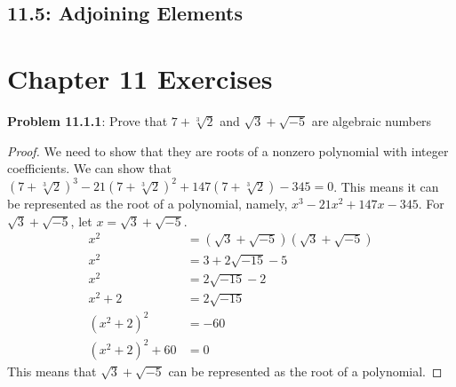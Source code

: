 \documentclass[12pt]{article}
\begin{document}
\subsection*{11.5: Adjoining Elements}
\begin{itemize}
\end{itemize}

\newpage
\section*{Chapter 11 Exercises}
\textbf{Problem 11.1.1}: Prove that $7 + \sqrt[3]{2}$ and $\sqrt{3} + \sqrt{-5}$ are algebraic numbers
\begin{proof}
We need to show that they are roots of a nonzero polynomial with integer coefficients. We can show that $(7 + \sqrt[3]{2})^3 - 21(7 + \sqrt[3]{2})^2 + 147(7 + \sqrt[3]{2}) - 345 = 0$. This means it can be represented as the root of a polynomial, namely, $x^3 - 21x^2 + 147x - 345$. For $\sqrt{3} + \sqrt{-5}$, let $x = \sqrt{3} + \sqrt{-5}$.
\begin{align*}
  x^2 &= (\sqrt{3} + \sqrt{-5})(\sqrt{3} + \sqrt{-5}) \\
  x^2 &= 3 + 2\sqrt{-15} - 5 \\
  x^2 &= 2\sqrt{-15} - 2 \\
  x^2 + 2 &= 2\sqrt{-15} \\
  (x^2 + 2)^2 &= -60 \\
  (x^2 + 2)^2 + 60 &= 0
\end{align*}
This means that $\sqrt{3} + \sqrt{-5}$ can be represented as the root of a polynomial.
\end{proof}
\end{document}
